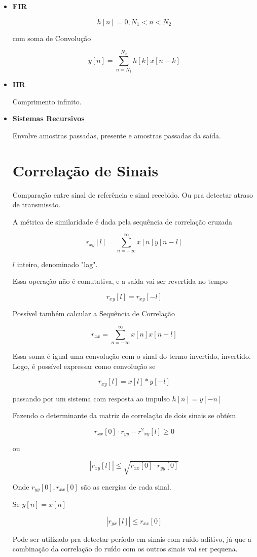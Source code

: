 \begin{itemize}
    \item \textbf{FIR}
    
    \[h[n] = 0, N_{1} < n < N_{2}\]

    com soma de Convolução

    \[y[n] = \sum_{n = N_{1}}^{N_{2}}h[k]x[n - k] \]

    \item \textbf{IIR}
    
    Comprimento infinito.

    \item \textbf{Sistemas Recursivos}
    
    Envolve amostras passadas, presente e amostras passadas da saída.


\section{Correlação de Sinais}

Comparação entre sinal de referência e sinal recebido. Ou pra detectar atraso de transmissão.

A métrica de similaridade é dada pela sequência de correlação cruzada 

\[r_{xy}[l] = \sum_{n = -\infty}^{\infty}x[n]y[n - l] \]

$l$ inteiro, denominado "lag".

Essa operação não é comutativa, e a saída vai ser revertida no tempo

\[r_{xy}[l] = r_{xy}[-l]\]

Possível também calcular a Sequência de Correlação

\[r_{xx} = \sum_{n = -\infty}^{\infty}x[n]x[n - l]\]

Essa soma é igual uma convolução com o sinal do termo invertido, invertido. Logo, é possível expressar como convolução se 

\[r_{xy}[l] = x[l] * y[-l]\]

passando por um sistema com resposta ao impulso $h[n] = y[-n]$

Fazendo o determinante da matriz de correlação de dois sinais se obtém

\[r_{xx}[0] \cdot r_{yy} - {r^{2}}_{xy}[l] \geq 0\]

ou 

\[|r_{xy}[l]| \leq \sqrt{r_{xx}[0] \cdot r_{yy}[0]}\]

Onde $r_{yy}[0], r_{xx}[0]$ são as energias de cada sinal.

Se $y[n] = x[n]$

\[|r_{yx}[l]| \leq  r_{xx}[0] \]

Pode ser utilizado pra detectar período em sinais com ruído aditivo, já que a combinação da correlação do ruído com os outros sinais vai ser pequena. 
\end{itemize}
